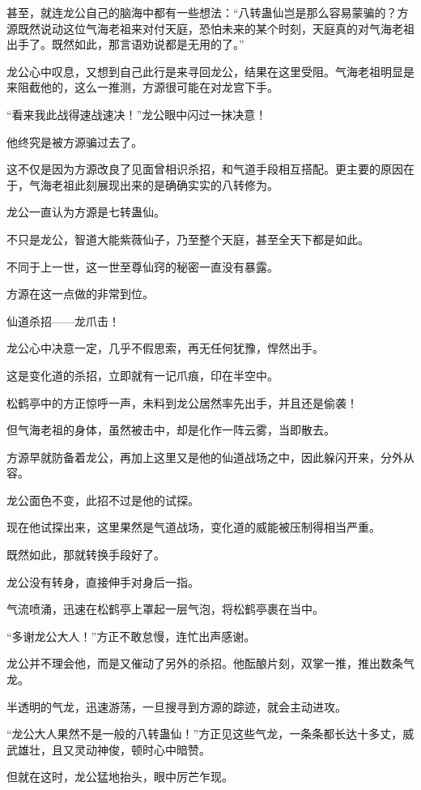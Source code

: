 \begin{this_body}
甚至，就连龙公自己的脑海中都有一些想法：“八转蛊仙岂是那么容易蒙骗的？方源既然说动这位气海老祖来对付天庭，恐怕未来的某个时刻，天庭真的对气海老祖出手了。既然如此，那言语劝说都是无用的了。”

龙公心中叹息，又想到自己此行是来寻回龙公，结果在这里受阻。气海老祖明显是来阻截他的，这么一推测，方源很可能在对龙宫下手。

“看来我此战得速战速决！”龙公眼中闪过一抹决意！

他终究是被方源骗过去了。

这不仅是因为方源改良了见面曾相识杀招，和气道手段相互搭配。更主要的原因在于，气海老祖此刻展现出来的是确确实实的八转修为。

龙公一直认为方源是七转蛊仙。

不只是龙公，智道大能紫薇仙子，乃至整个天庭，甚至全天下都是如此。

不同于上一世，这一世至尊仙窍的秘密一直没有暴露。

方源在这一点做的非常到位。

仙道杀招——龙爪击！

龙公心中决意一定，几乎不假思索，再无任何犹豫，悍然出手。

这是变化道的杀招，立即就有一记爪痕，印在半空中。

松鹤亭中的方正惊呼一声，未料到龙公居然率先出手，并且还是偷袭！

但气海老祖的身体，虽然被击中，却是化作一阵云雾，当即散去。

方源早就防备着龙公，再加上这里又是他的仙道战场之中，因此躲闪开来，分外从容。

龙公面色不变，此招不过是他的试探。

现在他试探出来，这里果然是气道战场，变化道的威能被压制得相当严重。

既然如此，那就转换手段好了。

龙公没有转身，直接伸手对身后一指。

气流喷涌，迅速在松鹤亭上罩起一层气泡，将松鹤亭裹在当中。

“多谢龙公大人！”方正不敢怠慢，连忙出声感谢。

龙公并不理会他，而是又催动了另外的杀招。他酝酿片刻，双掌一推，推出数条气龙。

半透明的气龙，迅速游荡，一旦搜寻到方源的踪迹，就会主动进攻。

“龙公大人果然不是一般的八转蛊仙！”方正见这些气龙，一条条都长达十多丈，威武雄壮，且又灵动神俊，顿时心中暗赞。

但就在这时，龙公猛地抬头，眼中厉芒乍现。


\end{this_body}
